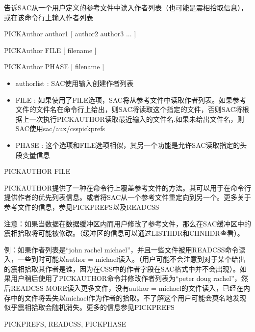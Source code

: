 \label{cmd:pickauthor}

告诉SAC从一个用户定义的参考文件中读入作者列表（也可能是震相拾取信息），或在该命令行上输入作者列表

PICKAuthor author1 [ author2 author3 ... ]

PICKAuthor FILE [ filename ]

PICKAuthor PHASE [ filename ]

\begin{itemize}
\item authorlist : SAC使用输入创建作者列表 
\item FILE : 如果使用了FILE选项，SAC将从参考文件中读取作者列表。如果参考文件的文件名在命令行上给出，则SAC将读取这个指定的文件，否则SAC将根据上一次执行PICKAUTHOR读取最近输入的文件名.如果未给出文件名，则SAC使用sac/aux/csspickprefs
\item PHASE : 这个选项和FILE选项相似，其另一个功能是允许SAC读取指定的头段变量信息 
\end{itemize}

PICKAUTHOR FILE

PICKAUTHOR提供了一种在命令行上覆盖参考文件的方法。其可以用于在命令行提供作者的优先列表信息。或者将SAC从一个参考文件重定向到另一个。更多关于参考文件的信息，参见PICKPREFS以及READCSS

注意：如果当数据在数据缓冲区内而用户修改了参考文件，那么在SAC缓冲区中的震相拾取将可能被修改。（缓冲区的信息可以通过LISTHDR和CHNHDR查看）。

例：如果作者列表是``john rachel michael''，并且一些文件被用READCSS命令读入，一些到时可能以author = michael读入。（用户可能不会注意到对于某个给出的震相拾取其作者是谁，因为在CSS中的作者字段在SAC格式中并不会出现）。如果用户稍后使用了PICKAUTHOR命令并修改作者列表为``peter doug rachel''，然后READCSS MORE读入更多文件，没有author = michael的文件读入，已经在内存中的文件将丢失以michael作为作者的拾取。不了解这个用户可能会莫名地发现似乎震相拾取会随机消失。更多的信息参见PICKPREFS

PICKPREFS, READCSS, PICKPHASE
